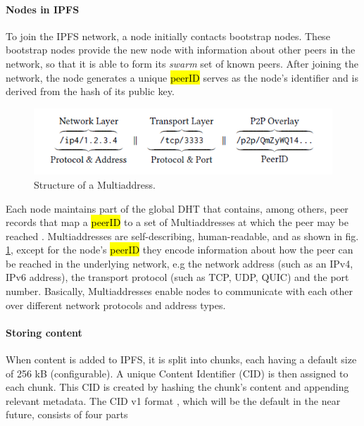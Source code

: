 \paragraph{Nodes in IPFS}\label{par:nodes_ipfs}
To join the IPFS network, a node initially contacts bootstrap nodes. These bootstrap nodes provide the new node with information about other peers in the network, so that it is able to form its \textit{swarm}  set of known peers. After joining the network, the node generates a unique \hl{peerID}  serves as the node's identifier and is derived from the hash of its public key.

\begin{figure}[htbp]
    \centerline{\includegraphics{figs/Multiaddress.png}}
    \caption{Structure of a Multiaddress. \citep{trautwein_2022}}
    \label{fig:multiaddress}
\end{figure}

Each node maintains part of the global DHT that contains, among others, peer records that map a \hl{peerID} to a set of Multiaddresses at which the peer may be reached \citep{schmahmann_2020}. Multiaddresses \citep{multiaddress_2023} are self-describing, human-readable, and as shown in fig. \ref{fig:multiaddress}, except for the node's \hl{peerID} they encode information about how the peer can be reached in the underlying network, e.g the network address (such as an IPv4, IPv6 address), the transport protocol (such as TCP, UDP, QUIC) and the port number. Basically, Multiaddresses enable nodes to communicate with each other over different network protocols and address types.

\paragraph{Storing content}\label{par:storing_ipfs}
When content is added to IPFS, it is split into chunks, each having a default size of 256 kB (configurable). A unique Content Identifier (CID) is then assigned to each chunk. This CID is created by hashing the chunk's content and appending relevant metadata.  The CID v1 format \citep{multiformat}, which will be the default in the near future, consists of four parts

